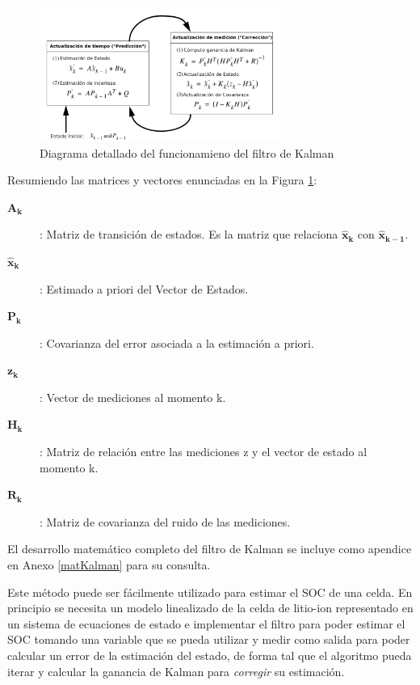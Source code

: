 \documentclass[10pt,a4paper]{article}
\begin{document}
\begin{figure}[h!]
    \begin{center}
        \includegraphics[width=0.7\textwidth]{kf_complete_esp.png}
        \caption{Diagrama detallado del funcionamieno del filtro de Kalman}
        \label{complete_kf}
    \end{center}
\end{figure}
\FloatBarrier

Resumiendo las matrices y vectores enunciadas en la Figura \ref{complete_kf}:

\begin{description}
    \item [$\mathbf{A_{k}}$]: Matriz de transición de estados. Es la matriz que
        relaciona $\mathbf{\hat{x}_{k}}$ con $\mathbf{\hat{x}_{k-1}}$.
    \item [$\mathbf{\hat{x}_{k}}$]: Estimado a priori del Vector de Estados.
    \item [$\mathbf{P_{k}}$]: Covarianza del error asociada a la estimación a priori.
    \item [$\mathbf{z_{k}}$]: Vector de mediciones al momento k.
    \item [$\mathbf{H_{k}}$]: Matriz de relación entre las mediciones z y el vector de
        estado al momento k.
    \item [$\mathbf{R_{k}}$]: Matriz de covarianza del ruido de las mediciones.
\end{description}

El desarrollo matemático completo del filtro de Kalman se incluye como apendice
en Anexo \ref{matKalman} para su consulta.

\noindent Este m\'etodo puede ser f\'acilmente utilizado para estimar el 
\acrshort{SOC} de una celda. En principio se necesita un modelo linealizado de la 
celda de litio-ion representado en un sistema de ecuaciones de estado e 
implementar el filtro para poder estimar el \acrshort{SOC} tomando una variable 
que se pueda utilizar y medir como salida para poder calcular un error de la 
estimaci\'on del estado, de forma tal que el algoritmo pueda iterar y calcular 
la ganancia de Kalman para \emph{corregir} su estimaci\'on.
\end{document}
